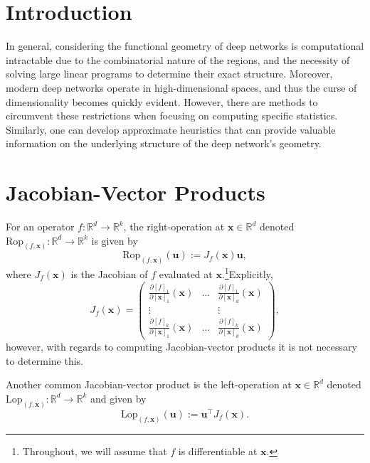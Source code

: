 \section{Introduction}

In general, considering the functional geometry of deep networks is computational intractable due to the combinatorial nature of the regions, and the necessity of solving large linear programs to determine their exact structure. Moreover, modern deep networks operate in high-dimensional spaces, and thus the curse of dimensionality becomes quickly evident. However, there are methods to circumvent these restrictions when focusing on computing specific statistics. Similarly, one can develop approximate heuristics that can provide valuable information on the underlying structure of the deep network's geometry.

\section{Jacobian-Vector Products}\label{sec:jvp}

For an operator $f:\mathbb{R}^d\to\mathbb{R}^k$, the right-operation at $\mathbf{x}\in\mathbb{R}^d$ denoted $\mathrm{Rop}_{(f,\mathbf{x})}:\mathbb{R}^d\to\mathbb{R}^k$ is given by $$\mathrm{Rop}_{(f,\mathbf{x})}(\mathbf{u}):=J_f(\mathbf{x})\mathbf{u},$$where $J_f(\mathbf{x})$ is the Jacobian of $f$ evaluated at $\mathbf{x}$.\footnote{Throughout, we will assume that $f$ is differentiable at $\mathbf{x}$.}Explicitly, $$J_f(\mathbf{x})=\begin{pmatrix}\frac{\partial[f]_1}{\partial[\mathbf{x}]_1}(\mathbf{x})&\dots&\frac{\partial[f]_1}{\partial[\mathbf{x}]_d}(\mathbf{x})\\\vdots&&\vdots\\\frac{\partial[f]_k}{\partial[\mathbf{x}]_1}(\mathbf{x})&\dots&\frac{\partial[f]_k}{\partial[\mathbf{x}]_d}(\mathbf{x})\end{pmatrix},$$however, with regards to computing Jacobian-vector products it is not necessary to determine this.

Another common Jacobian-vector product is the left-operation at $\mathbf{x}\in\mathbb{R}^d$ denoted $\mathrm{Lop}_{(f,\mathbf{x})}:\mathbb{R}^d\to\mathbb{R}^k$ and given by $$\mathrm{Lop}_{(f,\mathbf{x})}(\mathbf{u}):=\mathbf{u}^\top J_f(\mathbf{x}).$$

